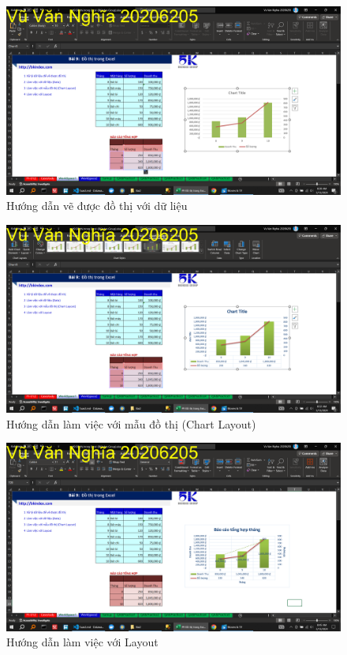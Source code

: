 \documentclass{article}
\begin{document}
\begin{figure}[H]
\centering
\includegraphics[scale = 0.15]{Bai2/HuongDan/1.png}
\caption{Hướng dẫn vẽ được đồ thị với dữ liệu}
\end{figure}

\begin{figure}[H]
\centering
\includegraphics[scale = 0.15]{Bai2/HuongDan/2.png}
\caption{Hướng dẫn làm việc với mẫu đồ thị (Chart Layout)}
\end{figure}

\begin{figure}[H]
\centering
\includegraphics[scale = 0.15]{Bai2/HuongDan/3.png}
\caption{Hướng dẫn làm việc với Layout}
\end{figure}
\end{document}
